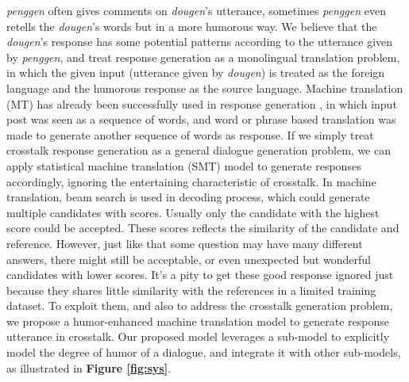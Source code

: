 \documentclass[letterpaper]{article} %
\begin{document}
\begin{CJK*}{UTF8}{gbsn}
\textit{penggen} often gives comments on \textit{dougen}'s utterance, sometimes \textit{penggen} even retells the \textit{dougen}'s words but in a more humorous way. We believe that the \textit{dougen}'s response has some potential patterns according to
the utterance given by \textit{penggen}, and treat response generation as a monolingual translation problem, in which the given input (utterance given by \textit{dougen}) is treated as the foreign language and the humorous response as the source language. 
Machine translation (MT) has already been successfully used in response generation \cite{ritter2011data}, in which input post was seen as a sequence of words, and word or phrase based translation was made to generate another sequence of words as response. If we simply treat crosstalk response generation as a general dialogue generation problem, we can apply statistical machine translation (SMT) model \cite{koehn2003statistical} to generate responses accordingly, ignoring the entertaining characteristic of crosstalk. 
In machine translation, beam search is used in decoding process, which could generate multiple candidates with scores. Usually only the candidate with the highest score could be accepted. These scores reflects the similarity of the candidate and reference.
However, just like that some question may have many different answers, there might still be acceptable, or even unexpected but wonderful candidates with lower scores. It's a pity to get these good response ignored just because they shares little similarity with the references in a limited training dataset. 
To exploit them, and also to address the crosstalk generation problem, we propose a humor-enhanced machine translation model to generate response utterance in crosstalk. Our proposed model leverages a sub-model to explicitly model the degree of humor of a dialogue, and integrate it with other sub-models, as illustrated in \textbf{Figure \ref{fig:sys}}. %



\end{CJK*}
\end{document}
